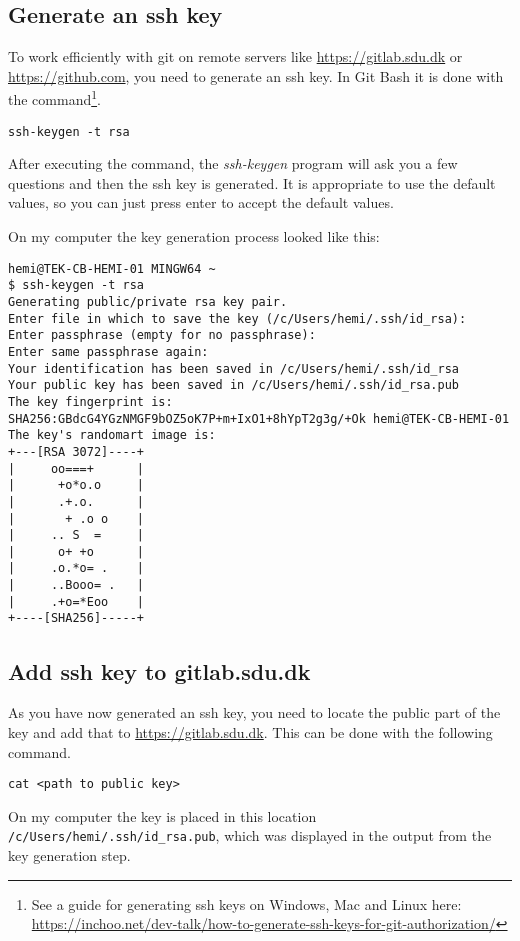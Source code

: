 \subsection{Generate an ssh key}

To work efficiently with git on remote servers like \url{https://gitlab.sdu.dk} or \url{https://github.com}, you need to generate 
an ssh key.
In Git Bash it is done with the command\footnote{See a guide for generating ssh keys on Windows, Mac and Linux here: \url{https://inchoo.net/dev-talk/how-to-generate-ssh-keys-for-git-authorization/}}.
\begin{verbatim}
ssh-keygen -t rsa
\end{verbatim}
After executing the command, the \emph{ssh-keygen} program
will ask you a few questions and then the ssh key is generated.
It is appropriate to use the default values, so you can just 
press enter to accept the default values.

On my computer the key generation process looked like this:
\begin{verbatim}
hemi@TEK-CB-HEMI-01 MINGW64 ~
$ ssh-keygen -t rsa
Generating public/private rsa key pair.
Enter file in which to save the key (/c/Users/hemi/.ssh/id_rsa):
Enter passphrase (empty for no passphrase):
Enter same passphrase again:
Your identification has been saved in /c/Users/hemi/.ssh/id_rsa
Your public key has been saved in /c/Users/hemi/.ssh/id_rsa.pub
The key fingerprint is:
SHA256:GBdcG4YGzNMGF9bOZ5oK7P+m+IxO1+8hYpT2g3g/+Ok hemi@TEK-CB-HEMI-01
The key's randomart image is:
+---[RSA 3072]----+
|     oo===+      |
|      +o*o.o     |
|      .+.o.      |
|       + .o o    |
|     .. S  =     |
|      o+ +o      |
|     .o.*o= .    |
|     ..Booo= .   |
|     .+o=*Eoo    |
+----[SHA256]-----+
\end{verbatim}

\subsection{Add ssh key to gitlab.sdu.dk}

As you have now generated an ssh key, you need to locate the 
public part of the key and add that to \url{https://gitlab.sdu.dk}.
This can be done with the following command.
\begin{verbatim}
cat <path to public key>
\end{verbatim}

On my computer the key is placed in this location 
\verb!/c/Users/hemi/.ssh/id_rsa.pub!, which was displayed 
in the output from the key generation step.


